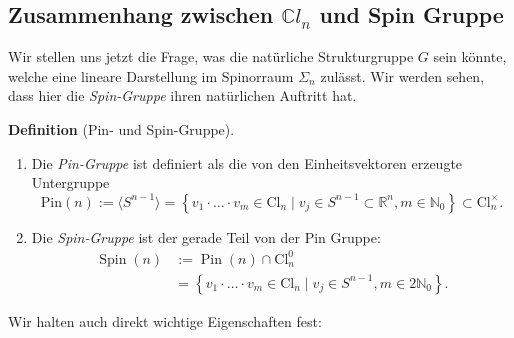 \documentclass[10pt, letterpaper]{article}
\newcommand{\C}{\mathbb{C}}
\newcommand{\Cl}{\mathrm{Cl}}
\newcommand{\Pin}{\mathrm{Pin}}
\newcommand{\CustomHeading}[3]{%
  \par\medskip\noindent%
  \textbf{#1 #2} \textnormal{(#3)}.\enskip%
}
\newenvironment{DEF}[2]{\CustomHeading{Definition}{#1}{#2}}{}
\begin{document}
\subsection{Zusammenhang zwischen $\C l_n$ und Spin Gruppe}


Wir stellen uns jetzt die Frage, was die natürliche Strukturgruppe $G$ sein könnte, welche eine lineare Darstellung im Spinorraum $\Sigma_n$ zulässt. Wir werden sehen, dass hier die \emph{Spin-Gruppe} ihren natürlichen Auftritt hat. 

\begin{DEF}{}{Pin- und Spin-Gruppe}
\begin{enumerate}
\item Die \emph{Pin-Gruppe} ist definiert als die von den Einheitsvektoren erzeugte Untergruppe
\[
\Pin(n):=\langle S^{n-1}\rangle = \left\{v_1 \cdot \ldots \cdot v_m \in \mathrm{Cl}_n \mid v_j \in S^{n-1} \subset \mathbb{R}^n, m \in \mathbb{N}_0\right\} \subset \Cl_n^\times.
\]

\item Die \emph{Spin-Gruppe} ist der gerade Teil von der Pin Gruppe:
$$
\begin{aligned}
\operatorname{Spin}(n) & :=\operatorname{Pin}(n) \cap \mathrm{Cl}_n^0 \\
& =\left\{v_1 \cdot \ldots \cdot v_m \in \mathrm{Cl}_n \mid v_j \in S^{n-1}, m \in 2 \mathbb{N}_0\right\} .
\end{aligned}
$$
\end{enumerate}
\end{DEF}

\bigskip

Wir halten auch direkt wichtige Eigenschaften fest:
\end{document}
